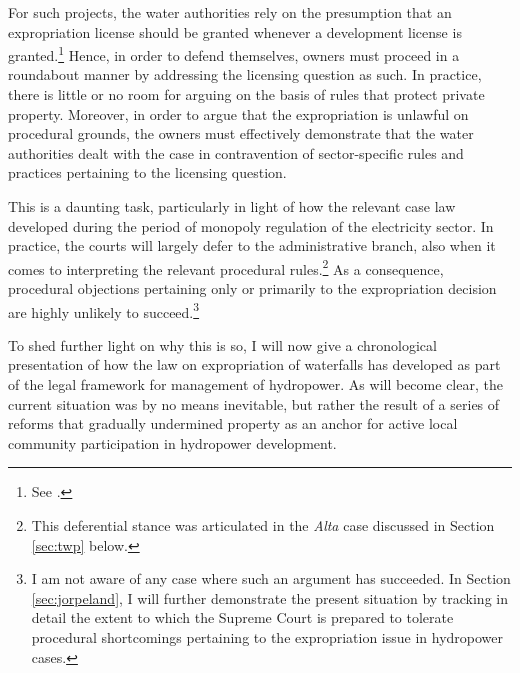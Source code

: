For such projects, the water authorities rely on the presumption that an expropriation license should be granted whenever a development license is granted.\footnote{See \cite{flatby08}.} Hence, in order to defend themselves, owners must proceed in a roundabout manner by addressing the licensing question as such. In practice, there is little or no room for arguing on the basis of rules that protect private property. Moreover, in order to argue that the expropriation is unlawful on procedural grounds, the owners must effectively demonstrate that the water authorities dealt with the case in contravention of sector-specific rules and practices pertaining to the licensing question.

This is a daunting task, particularly in light of how the relevant case law developed during the period of monopoly regulation of the electricity sector. In practice, the courts will largely defer to the administrative branch, also when it comes to interpreting the relevant procedural rules.\footnote{This  deferential stance was articulated in the {\it Alta} case discussed in Section \ref{sec:twp} below.} As a consequence, procedural objections pertaining only or primarily to the expropriation decision are highly unlikely to succeed.\footnote{I am not aware of any case where such an argument has succeeded. In Section \ref{sec:jorpeland}, I will further demonstrate the present situation by tracking in detail the extent to which the Supreme Court is prepared to tolerate procedural shortcomings pertaining to the expropriation issue in hydropower cases.}%

To shed further light on why this is so, I will now give a chronological presentation of how the law on expropriation of waterfalls has developed as part of the legal framework for management of hydropower. As will become clear, the current situation was by no means inevitable, but rather the result of a series of reforms that gradually undermined property as an anchor for active local community participation in hydropower development.

